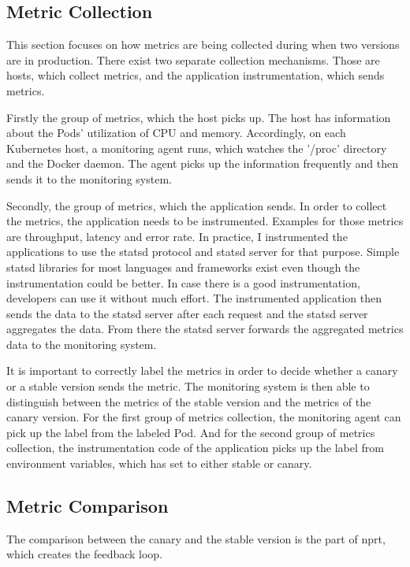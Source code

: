 \subsection{Metric Collection}

This section focuses on how metrics are being collected during when two versions are in
production. There exist two separate collection mechanisms. Those are hosts, which collect
metrics, and the application instrumentation, which sends metrics.

Firstly the group of metrics, which the host picks up. The host has information about the
Pods' utilization of CPU and memory. Accordingly, on each Kubernetes host, a monitoring
agent runs, which watches the '/proc' directory and the Docker daemon. The agent picks up
the information frequently and then sends it to the monitoring system.

Secondly, the group of metrics, which the application sends. In order to collect the
metrics, the application needs to be instrumented. Examples for those metrics are
throughput, latency and error rate. In practice, I instrumented the applications to use the
statsd protocol and statsd server for that purpose. Simple statsd libraries for most
languages and frameworks exist even though the instrumentation could be better. In case
there is a good instrumentation, developers can use it without much effort. The
instrumented application then sends the data to the statsd server after each request and
the statsd server aggregates the data. From there the statsd server forwards the
aggregated metrics data to the monitoring system.

It is important to correctly label the metrics in order to decide whether a canary or a
stable version sends the metric. The monitoring system is then able to distinguish between
the metrics of the stable version and the metrics of the canary version. For the first
group of metrics collection, the monitoring agent can pick up the label from the labeled
Pod. And for the second group of metrics collection, the instrumentation code of the
application picks up the label from environment variables, which \deployer has set to
either stable or canary.

\subsection{Metric Comparison}
\label{sec:metric_comparison}

The comparison between the canary and the stable version is the part of \gls{nprt}, which
creates the feedback loop.


